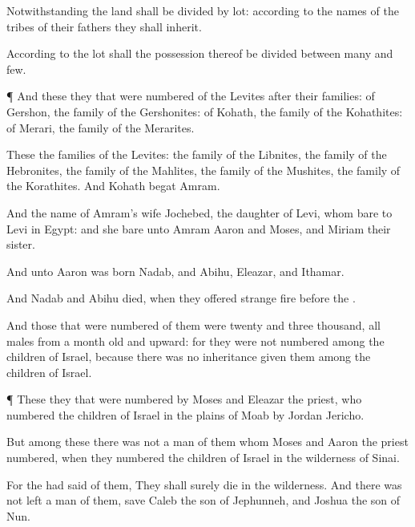 {Notwithstanding the
land shall be
divided by
lot: according to the
names of the
tribes of their
fathers they shall
inherit.

According to the
lot shall the
possession thereof be
divided between
many and
few.


\par }{\PP {}¶ And these
{} they that were
numbered of the
Levites after their
families: of
Gershon, the
family of the
Gershonites: of
Kohath, the
family of the
Kohathites: of
Merari, the
family of the
Merarites.

These
{} the
families of the
Levites: the
family of the
Libnites, the
family of the
Hebronites, the
family of the
Mahlites, the
family of the
Mushites, the
family of the
Korathites. And
Kohath
begat
Amram.

And the
name of
Amram’s
wife
{}
Jochebed, the
daughter of
Levi, whom
{}
bare to
Levi in
Egypt: and she
bare unto
Amram
Aaron and
Moses, and
Miriam their
sister.

And unto
Aaron was
born
Nadab, and
Abihu,
Eleazar, and
Ithamar.

And
Nadab and
Abihu
died, when they
offered
strange
fire
before the
{}.

And those that were
numbered of them were
twenty and
three
thousand, all
males from a
month
old and
upward: for they were not
numbered
among the
children of
Israel, because there was no
inheritance
given them
among the
children of
Israel.


\par }{\PP {}¶ These
{} they that were
numbered by
Moses and
Eleazar the
priest, who
numbered the
children of
Israel in the
plains of
Moab by
Jordan
{}
Jericho.

But among these there was not a
man of them whom
Moses and
Aaron the
priest
numbered, when they
numbered the
children of
Israel in the
wilderness of
Sinai.

For the
{} had
said of them, They shall
surely
die in the
wilderness. And there was not
left a
man of them, save
Caleb the
son of
Jephunneh, and
Joshua the
son of
Nun.




\par }
